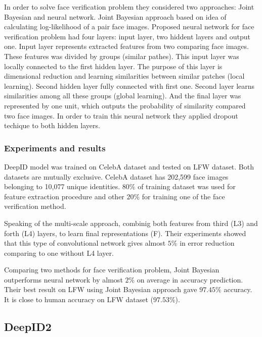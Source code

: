 \documentclass[paper=a4, fontsize=11pt]{scrartcl} %
\numberwithin{equation}{section} %
\numberwithin{figure}{section} %
\numberwithin{table}{section} %
\begin{document}
In order to solve face verification problem they considered two approaches: Joint Bayesian and neural network. Joint Bayesian approach based on idea of calculating log-likelihood of a pair face images. Proposed neural network for face verification problem had four layers: input layer, two hiddent layers and output one. Input layer represents extracted features from two comparing face images. These features was divided by groups (similar pathes). This input layer was locally connected to the first hidden layer. The purpose of this layer is dimensional reduction and learning similarities between similar patches (local learning). Second hidden layer fully connected with first one. Second layer learns similarities among all these groups (global learning). And the final layer was represented by one unit, which outputs the probability of similarity compared two face images. In order to train this neural network they applied dropout techique to both hidden layers.

\subsubsection{Experiments and results}

DeepID model was trained on CelebA \cite{liu2015faceattributes} dataset and tested on LFW dataset. Both datasets are mutually exclusive. CelebA dataset has 202,599 face images belonging to 10,077 unique identities. $80\%$ of training dataset was used for feature extraction procedure and other $20\%$ for training one of the face verification method. \par

Speaking of the multi-scale approach, combinig both features from third (L3) and forth (L4) layers, to learn final representations (F). Their experiments showed that this type of convolutional network gives almost $5\%$ in error reduction comparing to one without L4 layer. \par

Comparing two methods for face verification problem, Joint Bayesian outperforms neural network by almost $2\%$ on average in accuracy prediction. Their best result on LFW using Joint Bayesian approach gave $97.45\%$ accuracy. It is close to human accuracy on LFW dataset ($97.53\%$).

\subsection{DeepID2}
\end{document}
